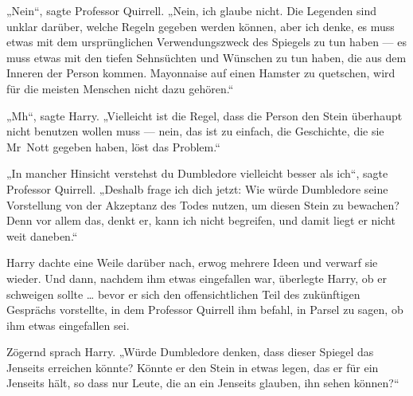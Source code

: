 „Nein“, sagte Professor Quirrell.
„Nein, ich glaube nicht. Die Legenden sind unklar darüber, welche Regeln gegeben werden können, aber ich denke, es muss etwas mit dem ursprünglichen Verwendungszweck des Spiegels zu tun haben — es muss etwas mit den tiefen Sehnsüchten und Wünschen zu tun haben, die aus dem Inneren der Person kommen. Mayonnaise auf einen Hamster zu quetschen, wird für die meisten Menschen nicht dazu gehören.“

„Mh“, sagte Harry.
„Vielleicht ist die Regel, dass die Person den Stein überhaupt nicht benutzen wollen muss — nein, das ist zu einfach, die Geschichte, die sie Mr~Nott gegeben haben, löst das Problem.“

„In mancher Hinsicht verstehst du Dumbledore vielleicht besser als ich“, sagte Professor Quirrell.
„Deshalb frage ich dich jetzt: Wie würde Dumbledore seine Vorstellung von der Akzeptanz des Todes nutzen, um diesen Stein zu bewachen? Denn vor allem das, denkt er, kann ich nicht begreifen, und damit liegt er nicht weit daneben.“

Harry dachte eine Weile darüber nach, erwog mehrere Ideen und verwarf sie wieder. Und dann, nachdem ihm etwas eingefallen war, überlegte Harry, ob er schweigen sollte … bevor er sich den offensichtlichen Teil des zukünftigen Gesprächs vorstellte, in dem Professor Quirrell ihm befahl, in Parsel zu sagen, ob ihm etwas eingefallen sei.

Zögernd sprach Harry.
„Würde Dumbledore denken, dass dieser Spiegel das Jenseits erreichen könnte? Könnte er den Stein in etwas legen, das er für ein Jenseits hält, so dass nur Leute, die an ein Jenseits glauben, ihn sehen können?“

